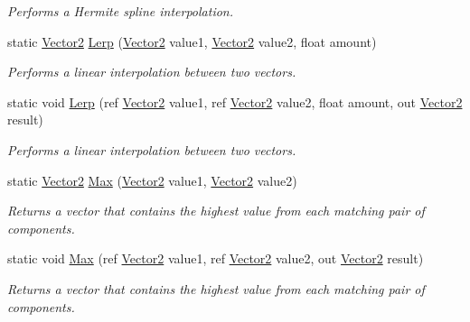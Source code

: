 \begin{DoxyCompactItemize}
\begin{DoxyCompactList}\small\item\em Performs a Hermite spline interpolation.\end{DoxyCompactList}\item 
static \hyperlink{structMicrosoft_1_1Xna_1_1Framework_1_1Vector2}{Vector2} \hyperlink{structMicrosoft_1_1Xna_1_1Framework_1_1Vector2_af12ac9f016f0ba67689f6dbfa1798bae}{Lerp} (\hyperlink{structMicrosoft_1_1Xna_1_1Framework_1_1Vector2}{Vector2} value1, \hyperlink{structMicrosoft_1_1Xna_1_1Framework_1_1Vector2}{Vector2} value2, float amount)
\begin{DoxyCompactList}\small\item\em Performs a linear interpolation between two vectors.\end{DoxyCompactList}\item 
static void \hyperlink{structMicrosoft_1_1Xna_1_1Framework_1_1Vector2_a0468cb2dd1569777b9e90a4e6f493445}{Lerp} (ref \hyperlink{structMicrosoft_1_1Xna_1_1Framework_1_1Vector2}{Vector2} value1, ref \hyperlink{structMicrosoft_1_1Xna_1_1Framework_1_1Vector2}{Vector2} value2, float amount, out \hyperlink{structMicrosoft_1_1Xna_1_1Framework_1_1Vector2}{Vector2} result)
\begin{DoxyCompactList}\small\item\em Performs a linear interpolation between two vectors.\end{DoxyCompactList}\item 
static \hyperlink{structMicrosoft_1_1Xna_1_1Framework_1_1Vector2}{Vector2} \hyperlink{structMicrosoft_1_1Xna_1_1Framework_1_1Vector2_a1639996234818854b497216d244a1c1f}{Max} (\hyperlink{structMicrosoft_1_1Xna_1_1Framework_1_1Vector2}{Vector2} value1, \hyperlink{structMicrosoft_1_1Xna_1_1Framework_1_1Vector2}{Vector2} value2)
\begin{DoxyCompactList}\small\item\em Returns a vector that contains the highest value from each matching pair of components.\end{DoxyCompactList}\item 
static void \hyperlink{structMicrosoft_1_1Xna_1_1Framework_1_1Vector2_a99c0e519fcd5842d8649debefecfc2a7}{Max} (ref \hyperlink{structMicrosoft_1_1Xna_1_1Framework_1_1Vector2}{Vector2} value1, ref \hyperlink{structMicrosoft_1_1Xna_1_1Framework_1_1Vector2}{Vector2} value2, out \hyperlink{structMicrosoft_1_1Xna_1_1Framework_1_1Vector2}{Vector2} result)
\begin{DoxyCompactList}\small\item\em Returns a vector that contains the highest value from each matching pair of components.\end{DoxyCompactList}\item 

\end{DoxyCompactItemize}
